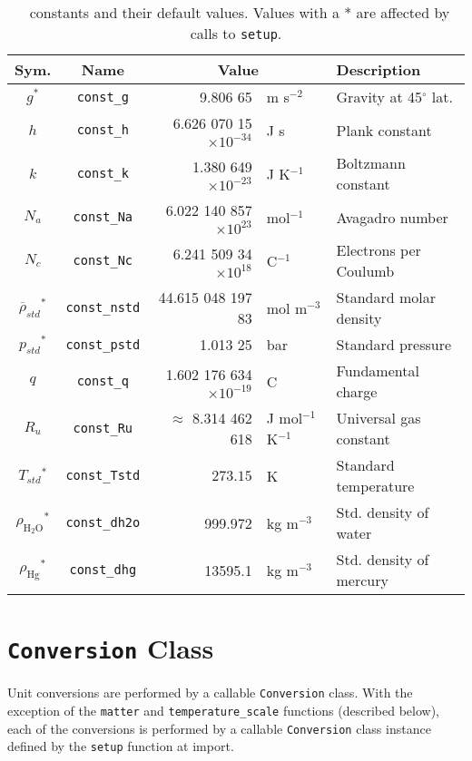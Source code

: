\begin{landscape}
\begin{table}[p]
\centering
\caption{\PM\ constants and their default values.  Values with a * are affected by calls to \texttt{setup}.}\label{tab:constants}
\small
\renewcommand{\arraystretch}{1.25}
\begin{tabular}{ccrll}
\hline
Sym. & Name & \multicolumn{2}{c}{Value} & Description \\
\hline
$g^*$ & \verb|const_g| & 9.806 65 & m s$^{-2}$ & Gravity at 45$^\circ$ lat.\\
$h$ & \verb|const_h| & 6.626 070 15$\times 10^{-34}$ & J s & Plank constant\\
$k$ & \verb|const_k| & 1.380 649 $\times 10^{-23}$ & J K$^{-1}$ & Boltzmann constant\\
$N_a$ & \verb|const_Na| & 6.022 140 857$\times 10^{23}$ & mol$^{-1}$ & Avagadro number\\
$N_c$ & \verb|const_Nc| & 6.241 509 34$\times 10^{18}$ & C$^{-1}$ & Electrons per Coulumb\\
$\overline{\rho}_{std}{^*}$ & \verb|const_nstd| & 44.615 048 197 83 & mol m$^{-3}$ & Standard molar density\\
$p_{std}{^*}$ & \verb|const_pstd| & 1.013 25 & bar & Standard pressure\\
$q$ & \verb|const_q| & 1.602 176 634 $\times 10^{-19}$ & C & Fundamental charge\\
$R_u$ & \verb|const_Ru| & $\approx$ 8.314 462 618 & J mol$^{-1}$ K$^{-1}$ & Universal gas constant\\
$T_{std}{^*}$ & \verb|const_Tstd| & $273.15$ & K & Standard temperature\\
$\rho_\mathrm{H_2O}{^*}$ & \verb|const_dh2o| & 999.972 & kg m$^{-3}$ & Std. density of water\\
$\rho_\mathrm{Hg}{^*}$ & \verb|const_dhg| & 13595.1 & kg m$^{-3}$ & Std. density of mercury\\
\hline
\end{tabular}
\renewcommand{\arraystretch}{1}
\end{table}
\end{landscape}

\section{\texttt{Conversion} Class}

Unit conversions are performed by a callable \verb|Conversion| class.  With the exception of the \verb|matter| and \verb|temperature_scale| functions (described below), each of the conversions is performed by a callable \verb|Conversion| class instance defined by the \verb|setup| function at import.

